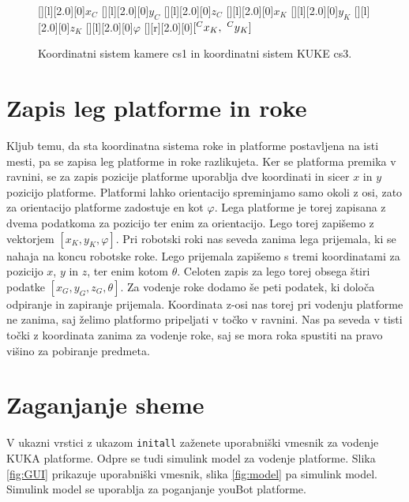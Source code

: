 \begin{figure}[h]
[][l][2.0][0]{$x_C$}
[][l][2.0][0]{$y_C$}
[][l][2.0][0]{$z_C$}
[][l][2.0][0]{\color{white}$x_K$}
[][l][2.0][0]{\color{white}$y_K$}
[][l][2.0][0]{\color{white}$z_K$}
[][l][2.0][0]{\color{white}$\varphi$}
\psfrag{[xK,yK]}[][r][2.0][0]{\color{white}$[\prescript{C}{}x_K,\,\,\prescript{C}{}y_K]$}
\centering {}
\caption{Koordinatni sistem kamere cs1 in koordinatni sistem KUKE cs3.}
\end{figure}

\section{Zapis leg platforme in roke}

Kljub temu, da sta koordinatna sistema roke in platforme postavljena na isti mesti, pa se zapisa leg platforme in roke razlikujeta. Ker se platforma premika v ravnini, se za zapis pozicije platforme uporablja dve koordinati in sicer $x$ in $y$ pozicijo platforme. Platformi lahko orientacijo spreminjamo samo okoli z osi, zato za orientacijo platforme zadostuje en kot $\varphi$. Lega platforme je torej zapisana z dvema podatkoma za pozicijo ter enim za orientacijo. Lego torej zapišemo z vektorjem $[x_K, y_K, \varphi]$.
Pri robotski roki nas seveda zanima lega prijemala, ki se nahaja na koncu robotske roke. Lego prijemala zapišemo s tremi koordinatami za pozicijo $x$, $y$ in $z$, ter enim kotom $\theta$. Celoten zapis za lego torej obsega štiri podatke $[x_G, y_G, z_G, \theta]$. Za vodenje roke dodamo še peti podatek, ki določa odpiranje in zapiranje prijemala.
Koordinata z-osi nas torej pri vodenju platforme ne zanima, saj želimo platformo pripeljati v točko v ravnini. Nas pa seveda v tisti točki z koordinata zanima za vodenje roke, saj se mora roka spustiti na pravo višino za pobiranje predmeta.

\section{Zaganjanje sheme}

V ukazni vrstici z ukazom \newline \newline \verb"initall"  \newline \newline zaženete uporabniški vmesnik za vodenje KUKA platforme. Odpre se tudi simulink model za vodenje platforme. Slika \ref{fig:GUI} prikazuje uporabniški vmesnik, slika \ref{fig:model} pa simulink model. Simulink model se uporablja za poganjanje youBot platforme. 

